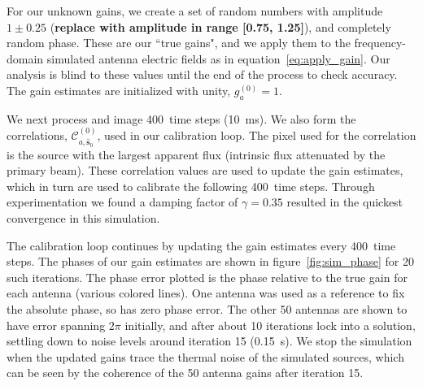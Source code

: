 \documentclass[a4paper,fleqn,usenatbib]{../mnras}
\newcommand{\spix}{\ensuremath{\hat{\mathbf{s}}_{0}}}
\newcommand{\Cna}[1][n]{\ensuremath{\mathcal{C}^{(#1)}_{a,\spix}}}
\newcommand{\caliter}{400}
\newcommand{\damp}{\ensuremath{\gamma}}
\begin{document}
For our unknown gains, we create a set of random numbers with amplitude $1\pm0.25$ ({\bf replace with amplitude in range [0.75, 1.25]}), and completely random phase. These are our ``true gains", and we apply them to the frequency-domain simulated antenna electric fields as in equation~\ref{eq:apply_gain}. Our analysis is blind to these values until the end of the process to check accuracy. The gain estimates are initialized with unity, $g^{(0)}_a=1$.

We next process and image \caliter~time steps (10~ms). We also form the correlations, \Cna[0], used in our calibration loop. The pixel used for the correlation is the source with the largest apparent flux (intrinsic flux attenuated by the primary beam). These correlation values are used to update the gain estimates, which in turn are used to calibrate the following \caliter~time steps. Through experimentation we found a damping factor of $\damp=0.35$ resulted in the quickest convergence in this simulation.

The calibration loop continues by updating the gain estimates every \caliter~time steps. The phases of our gain estimates are shown in figure~\ref{fig:sim_phase} for 20 such iterations. The phase error plotted is the phase relative to the true gain for each antenna (various colored lines). One antenna was used as a reference to fix the absolute phase, so has zero phase error. The other 50 antennas are shown to have error spanning $2\pi$ initially, and after about 10 iterations lock into a solution, settling down to noise levels around iteration 15 (0.15~s). We stop the simulation when the updated gains trace the thermal noise of the simulated sources, which can be seen by the coherence of the 50 antenna gains after iteration 15.
\end{document}
